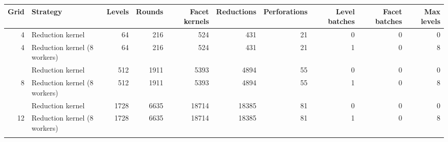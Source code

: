\begin{tabular}{rlrrrrrrrr}
\toprule
Grid & Strategy & Levels & Rounds & Facet kernels & Reductions & Perforations & Level batches & Facet batches & Max levels \\
\midrule
4 & Reduction kernel & 64 & 216 & 524 & 431 & 21 & 0 & 0 & 0 \\
4 & Reduction kernel (8 workers) & 64 & 216 & 524 & 431 & 21 & 1 & 0 & 8 \\
\addlinespace
8 & Reduction kernel & 512 & 1911 & 5393 & 4894 & 55 & 0 & 0 & 0 \\
8 & Reduction kernel (8 workers) & 512 & 1911 & 5393 & 4894 & 55 & 1 & 0 & 8 \\
\addlinespace
12 & Reduction kernel & 1728 & 6635 & 18714 & 18385 & 81 & 0 & 0 & 0 \\
12 & Reduction kernel (8 workers) & 1728 & 6635 & 18714 & 18385 & 81 & 1 & 0 & 8 \\
\addlinespace
\bottomrule
\end{tabular}
